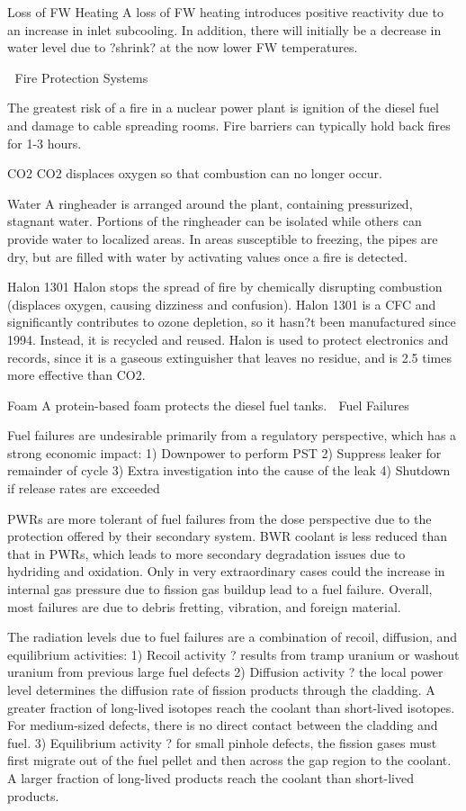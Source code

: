 \documentclass[10pt]{article}
\begin{document}
Loss of FW Heating
A loss of FW heating introduces positive reactivity due to an increase in inlet subcooling. In addition, there will initially be a decrease in water level due to ?shrink? at the now lower FW temperatures. 


Fire Protection Systems

The greatest risk of a fire in a nuclear power plant is ignition of the diesel fuel and damage to cable spreading rooms. Fire barriers can typically hold back fires for 1-3 hours. 

CO2
CO2 displaces oxygen so that combustion can no longer occur. 

Water
A ringheader is arranged around the plant, containing pressurized, stagnant water. Portions of the ringheader can be isolated while others can provide water to localized areas. In areas susceptible to freezing, the pipes are dry, but are filled with water by activating values once a fire is detected. 

Halon 1301
Halon stops the spread of fire by chemically disrupting combustion (displaces oxygen, causing dizziness and confusion). Halon 1301 is a CFC and significantly contributes to ozone depletion, so it hasn?t been manufactured since 1994. Instead, it is recycled and reused. Halon is used to protect electronics and records, since it is a gaseous extinguisher that leaves no residue, and is 2.5 times more effective than CO2. 

Foam
A protein-based foam protects the diesel fuel tanks. 

Fuel Failures

Fuel failures are undesirable primarily from a regulatory perspective, which has a strong economic impact:
1)	Downpower to perform PST
2)	Suppress leaker for remainder of cycle
3)	Extra investigation into the cause of the leak
4)	Shutdown if release rates are exceeded

PWRs are more tolerant of fuel failures from the dose perspective due to the protection offered by their secondary system. BWR coolant is less reduced than that in PWRs, which leads to more secondary degradation issues due to hydriding and oxidation. Only in very extraordinary cases could the increase in internal gas pressure due to fission gas buildup lead to a fuel failure. Overall, most failures are due to debris fretting, vibration, and foreign material. 

The radiation levels due to fuel failures are a combination of recoil, diffusion, and equilibrium activities:
1)	Recoil activity ? results from tramp uranium or washout uranium from previous large fuel defects
2)	Diffusion activity ? the local power level determines the diffusion rate of fission products through the cladding. A greater fraction of long-lived isotopes reach the coolant than short-lived isotopes. For medium-sized defects, there is no direct contact between the cladding and fuel.
3)	Equilibrium activity ? for small pinhole defects, the fission gases must first migrate out of the fuel pellet and then across the gap region to the coolant. A larger fraction of long-lived products reach the coolant than short-lived products. 
\end{document}
